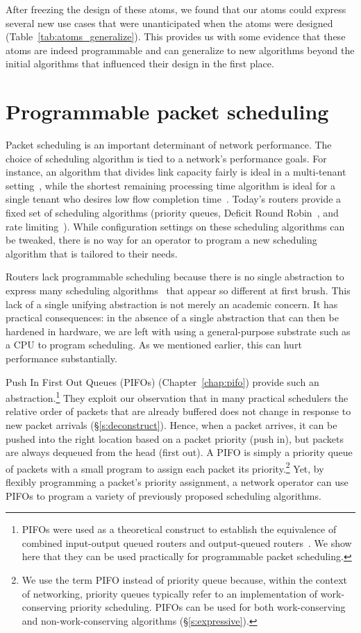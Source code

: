 After freezing the design of these atoms, we found that our atoms could express
several new use cases that were unanticipated when the atoms were designed
(Table~\ref{tab:atoms_generalize}). This provides us with some evidence that
these atoms are indeed programmable and can generalize to new algorithms beyond
the initial algorithms that influenced their design in the first place.

\section{Programmable packet scheduling}
\label{s:intro_pifo}

Packet scheduling is an important determinant of network performance. The
choice of scheduling algorithm is tied to a network's performance goals. For
instance, an algorithm that divides link capacity fairly is ideal in a
multi-tenant setting~\cite{wfq}, while the shortest remaining processing time
algorithm is ideal for a single tenant who desires low flow completion
time~\cite{pFabric}. Today's routers provide a fixed set of scheduling
algorithms (\eg priority queues, Deficit Round Robin~\cite{drr}, and rate
limiting~\cite{tbf}). While configuration settings on these scheduling
algorithms can be tweaked, there is no way for an operator to program a new
scheduling algorithm that is tailored to their needs.

Routers lack programmable scheduling because there is no single abstraction to
express many scheduling algorithms~\cite{wfq, srpt, srr, pFabric, lstf} that
appear so different at first brush. This lack of a single unifying abstraction
is not merely an academic concern. It has practical consequences: in the
absence of a single abstraction that can then be hardened in hardware, we are
left with using a general-purpose substrate such as a CPU to program
scheduling. As we mentioned earlier, this can hurt performance substantially.

 Push In First Out Queues (PIFOs) (Chapter~\ref{chap:pifo}) provide such an
abstraction.\footnote{PIFOs were used as a theoretical construct to
establish the equivalence of combined input-output queued routers and output-queued
routers~\cite{pifo}. We show here that they can be used
practically for programmable packet scheduling.} They exploit our observation
that in many practical schedulers the relative order of packets that are
already buffered does not change in response to new packet arrivals
(\S\ref{s:deconstruct}). Hence, when a packet arrives, it can be pushed into
the right location based on a packet priority (push in), but packets are always
dequeued from the head (first out). A PIFO is simply a priority queue of
packets with a small program to assign each packet its priority.\footnote{We use
the term PIFO instead of priority queue because, within the context of
networking, priority queues typically refer to an implementation of
work-conserving priority scheduling. PIFOs can be used for both work-conserving
and non-work-conserving algorithms (\S\ref{s:expressive}).} Yet, by flexibly
programming a packet's priority assignment, a network operator can use PIFOs to
program a variety of previously proposed scheduling algorithms. 

